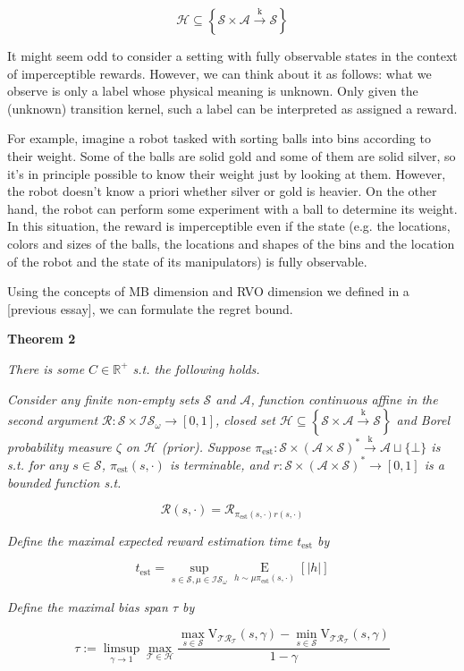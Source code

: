 \documentclass[a4paper]{article}
\newcommand{\Co}[1]{}
\newcommand{\San}[1]{}
\newcommand{\AP}[1]{\left(#1\right)}
\newcommand{\AB}[1]{\left[#1\right]}
\newcommand{\AC}[1]{\left\{#1\right\}}
\newcommand{\Abs}[1]{\left\vert #1 \right\vert}
\newcommand{\Ea}[2]{\underset{#1}{\operatorname{E}}\AB{#2}}
\newcommand{\Reals}{\mathbb{R}}
\newcommand{\K}{\xrightarrow{\mathrm{k}}}
\newcommand{\St}{\mathcal{S}}
\newcommand{\A}{\mathcal{A}}
\newcommand{\AX}{\A\sqcup\{\bot\}}
\newcommand{\FHS}{\AP{\A\times\St}^*}
\newcommand{\R}{\mathcal{R}}
\newcommand{\T}{\mathcal{T}}
\newcommand{\Hy}{\mathcal{H}}
\newcommand{\IS}{\mathcal{IS}}
\newcommand{\Est}{\mathrm{est}}
\newcommand{\PE}{\pi_\Est}
\newcommand{\V}{\mathrm{V}}
\begin{document}
$$\Hy\subseteq\AC{\St\times\A\K\St}$$

It might seem odd to consider a setting with fully observable states in the context of imperceptible rewards. However, we can think about it as follows: what we observe is only a label whose physical meaning is unknown. Only given the (unknown) transition kernel, such a label can be interpreted as assigned a reward.

For example, imagine a robot tasked with sorting balls into bins according to their weight. Some of the balls are solid gold and some of them are solid silver, so it's in principle possible to know their weight just by looking at them. However, the robot doesn't know a priori whether silver or gold is heavier. On the other hand, the robot can perform some experiment with a ball to determine its weight. In this situation, the reward is imperceptible even if the state (e.g. the locations, colors and sizes of the balls, the locations and shapes of the bins and the location of the robot and the state of its manipulators) is fully observable.

Using the concepts of MB dimension and RVO dimension we defined in a [previous essay]\San{(https://www.alignmentforum.org/posts/Qa5jG9z9dC6E4s9JH/dimensional-regret-without-resets)}, we can formulate the regret bound.

\textbf{Theorem 2}\Co{b}

\textit{There is some $C\in\Reals^+$ s.t. the following holds.}\Co{i}

\textit{Consider any finite non-empty sets $\St$ and $\A$, function continuous affine in the second argument $\R:\St\times\IS_\omega\rightarrow[0,1]$, closed set $\Hy\subseteq\AC{\St\times\A\K\St}$ and Borel probability measure $\zeta$ on $\Hy$ (prior). Suppose $\PE:\St\times\FHS\K\AX$ is s.t. for any $s\in\St$, $\PE(s,\cdot)$ is terminable, and $r:\St\times\FHS\rightarrow[0,1]$ is a bounded function s.t.}\Co{i}

$$\R(s,\cdot)=\R_{\pi_{\mathrm{est}}(s,\cdot)r(s,\cdot)}$$ 

\textit{Define the maximal expected reward estimation time $t_\Est$ by}\Co{i}

$$t_\Est=\sup_{s\in\St,\mu\in\IS_\omega}\Ea{h\sim\mu\pi_{\mathrm{est}}(s,\cdot)}{\Abs{h}}$$

\textit{Define the maximal bias span $\tau$ by}\Co{i}

$$\tau:=\limsup_{\gamma\rightarrow1}{\max_{\T\in\Hy}\frac{\max_{s\in\St}\V_{\T\R_\T}(s,\gamma)-\min_{s\in\St}\V_{\T\R_\T}(s,\gamma)}{1-\gamma}}$$
\end{document}
